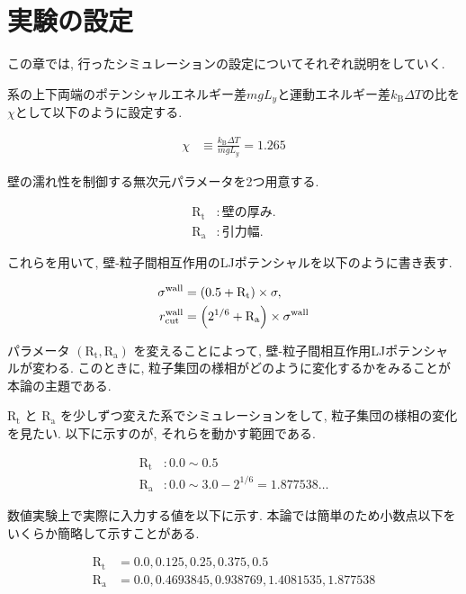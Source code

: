 \chapter{実験の設定}\label{sec:simulation}

この章では, 行ったシミュレーションの設定についてそれぞれ説明をしていく.

系の上下両端のポテンシャルエネルギー差$mgL_y$と運動エネルギー差$k_{\text{B}}\Delta T$の比を$\chi$として以下のように設定する.

\begin{align}
  \chi &\equiv \frac{k_{\text{B}}\Delta T}{mgL_{y}} = 1.265
\end{align}

壁の濡れ性を制御する無次元パラメータを2つ用意する.

\begin{align}
  \text{R}_\text{t} &: 壁の厚み. \\
  \text{R}_\text{a} &: 引力幅.
\end{align}

これらを用いて, 壁-粒子間相互作用のLJポテンシャルを以下のように書き表す.

\begin{align}
  \sigma^{\text{wall}} &= \qty(0.5 + \text{R}_\text{t}) \times \sigma , \\
  r^{\text{wall}}_{\text{cut}} &= \qty(2^{1/6} + \text{R}_\text{a}) \times \sigma^{\text{wall}} 
\end{align}

パラメータ $(\text{R}_\text{t}, \text{R}_\text{a})$ を変えることによって, 壁-粒子間相互作用LJポテンシャルが変わる. このときに, 粒子集団の様相がどのように変化するかをみることが本論の主題である.

$\text{R}_\text{t}$ と $\text{R}_\text{a}$ を少しずつ変えた系でシミュレーションをして, 粒子集団の様相の変化を見たい. 以下に示すのが, それらを動かす範囲である.

\begin{align}
  \text{R}_\text{t} &\colon 0.0 \sim 0.5 \\
  \text{R}_\text{a} &\colon 0.0 \sim 3.0 - 2^{1/6} = 1.877538\dots
\end{align}

数値実験上で実際に入力する値を以下に示す. 本論では簡単のため小数点以下をいくらか簡略して示すことがある.

\begin{align}
  \text{R}_\text{t} &= 0.0,  0.125,  0.25,  0.375,  0.5 \\
  \text{R}_\text{a} &= 0.0,  0.4693845,  0.938769,  1.4081535,  1.877538
\end{align}

